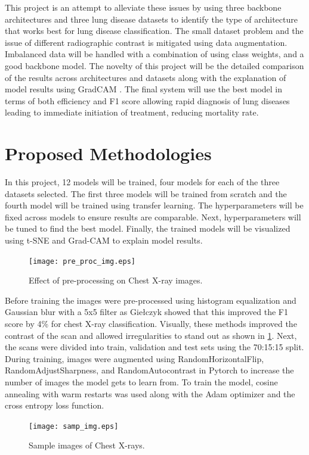 \documentclass[10pt,twocolumn,letterpaper]{article}
\begin{document}
This project is an attempt to alleviate these issues by using three backbone architectures and three lung disease datasets to identify the type of architecture that works best for lung disease classification. The small dataset problem and the issue of different radiographic contrast \cite{andrew2022rad} is mitigated using data augmentation. Imbalanced data will be handled with a combination of using class weights, and a good backbone model. The novelty of this project will be the detailed comparison of the results across architectures and datasets along with the explanation of model results using GradCAM \cite{jacobgilpytorchcam}. The final system will use the best model in terms of both efficiency and F1 score allowing rapid diagnosis of lung diseases leading to immediate initiation of treatment, reducing mortality rate.
\section{Proposed Methodologies}
\label{sec:prop_method}
In this project, 12 models will be trained, four models for each of the three datasets selected. The first three models will be trained from scratch and the fourth model will be trained using transfer learning. The hyperparameters will be fixed across models to ensure results are comparable. Next, hyperparameters will be tuned to find the best model. Finally, the trained models will be visualized using t-SNE and Grad-CAM to explain model results. 
\begin{figure}[t]
  \centering
  \texttt{[image: pre\_proc\_img.eps]}  
   \caption{Effect of pre-processing on Chest X-ray images.}
   \vspace{-1.5em}
   \label{fig:pre_proc_img}
\end{figure}
Before training the images were pre-processed using histogram equalization and Gaussian blur with a 5x5 filter as Giełczyk \etal \cite{gielczyk2022pre} showed that this improved the F1 score by 4\% for chest X-ray classification. Visually, these methods improved the contrast of the scan and allowed irregularities to stand out as shown in  \cref*{fig:pre_proc_img}. Next, the scans were divided into train, validation and test sets using the 70:15:15 split. During training, images were augmented using RandomHorizontalFlip, RandomAdjustSharpness, and RandomAutocontrast in Pytorch \cite{transforms} to increase the number of images the model gets to learn from. To train the model, cosine annealing with warm restarts \cite{loshchilov2016sgdr} was used along with the Adam optimizer \cite{kingma2014adam} and the cross entropy loss function. 
\begin{figure}[t]
  \centering
  \texttt{[image: samp\_img.eps]}  
   \caption{Sample images of Chest X-rays.}
   \vspace{-1em}
   \label{fig:sample_img}
\end{figure}
\end{document}
